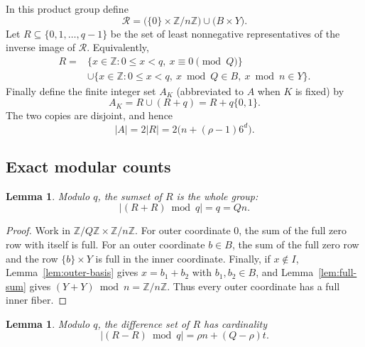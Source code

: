 \documentclass[11pt,reqno]{amsart}
\theoremstyle{plain}
\newtheorem{lemma}[theorem]{Lemma}
\theoremstyle{definition}
\theoremstyle{remark}
\theoremstyle{named}
\newcommand{\Z}{\mathbb Z}
\newcommand{\card}[1]{\lvert #1\rvert}
\begin{document}
In this product group define
\begin{equation}\label{eq:Rcal}
 \mathcal R=
 \bigl(\{0\}\times\Z/n\Z\bigr)
 \cup
 \bigl(B\times Y\bigr).
\end{equation}
Let $R\subseteq\{0,1,\ldots,q-1\}$ be the set of least nonnegative
representatives of the inverse image of $\mathcal R$.  Equivalently,
\begin{equation}\label{eq:R-explicit}
\begin{split}
 R={}&\{x\in\Z:0\le x<q,\ x\equiv0\pmod Q\}\\
 &\cup
 \{x\in\Z:0\le x<q,\ x\bmod Q\in B,\ x\bmod n\in Y\}.
\end{split}
\end{equation}
Finally define the finite integer set $A_K$ (abbreviated to $A$ when $K$ is
fixed) by
\begin{equation}\label{eq:A-definition}
 \boxed{A_K=R\cup(R+q)=R+q\{0,1\}.}
\end{equation}
The two copies are disjoint, and hence
\begin{equation}\label{eq:A-size}
 \card A=2\card R
 =2\bigl(n+(\rho-1)6^d\bigr).
\end{equation}

\subsection{Exact modular counts}

\begin{lemma}\label{lem:mod-sum}
Modulo $q$, the sumset of $R$ is the whole group:
\[
 \card{(R+R)\bmod q}=q=Qn.
\]
\end{lemma}

\begin{proof}
Work in $\Z/Q\Z\times\Z/n\Z$.  For outer coordinate $0$, the sum of the
full zero row with itself is full.  For an outer coordinate $b\in B$, the sum
of the full zero row and the row $\{b\}\times Y$ is full in the inner
coordinate.  Finally, if $x\notin I$, Lemma~\ref{lem:outer-basis} gives
$x=b_1+b_2$ with $b_1,b_2\in B$, and Lemma~\ref{lem:full-sum} gives
$(Y+Y)\bmod n=\Z/n\Z$. Thus every outer coordinate has a full inner fiber.
\end{proof}

\begin{lemma}\label{lem:mod-diff}
Modulo \(q\), the difference set of \(R\) has cardinality
\[
 \card{(R-R)\bmod q}=\rho n+(Q-\rho)t.
\]
\end{lemma}
\end{document}
